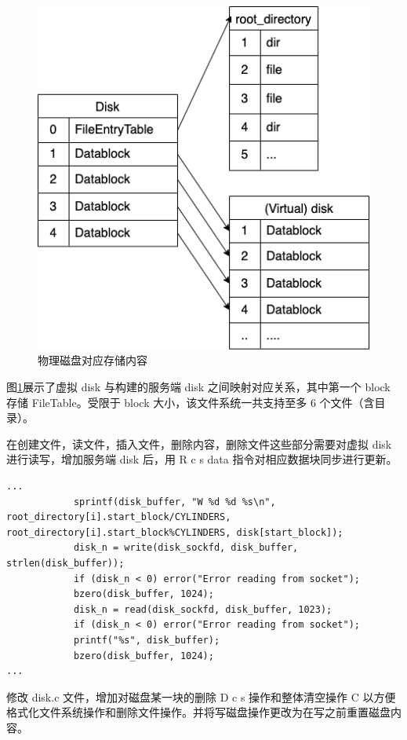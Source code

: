 \documentclass{article}
\begin{document}
\begin{figure}[H]
\center
\includegraphics[scale = 0.6]{s3-1.png}
\caption{物理磁盘对应存储内容}
\label{s3-1}
\end{figure}

图\ref{s3-1}展示了虚拟 disk 与构建的服务端 disk 之间映射对应关系，其中第一个 block 存储 FileTable。受限于 block 大小，该文件系统一共支持至多 6 个文件（含目录）。

在创建文件，读文件，插入文件，删除内容，删除文件这些部分需要对虚拟 disk 进行读写，增加服务端 disk 后，用 R c s data 指令对相应数据块同步进行更新。

\begin{lstlisting}
...
			sprintf(disk_buffer, "W %d %d %s\n", root_directory[i].start_block/CYLINDERS, root_directory[i].start_block%CYLINDERS, disk[start_block]);
            disk_n = write(disk_sockfd, disk_buffer, strlen(disk_buffer));
            if (disk_n < 0) error("Error reading from socket");
            bzero(disk_buffer, 1024);
            disk_n = read(disk_sockfd, disk_buffer, 1023);
            if (disk_n < 0) error("Error reading from socket");
            printf("%s", disk_buffer);
            bzero(disk_buffer, 1024);
...
\end{lstlisting}

修改 disk.c 文件，增加对磁盘某一块的删除 D c s 操作和整体清空操作 C 以方便格式化文件系统操作和删除文件操作。并将写磁盘操作更改为在写之前重置磁盘内容。
\end{document}
